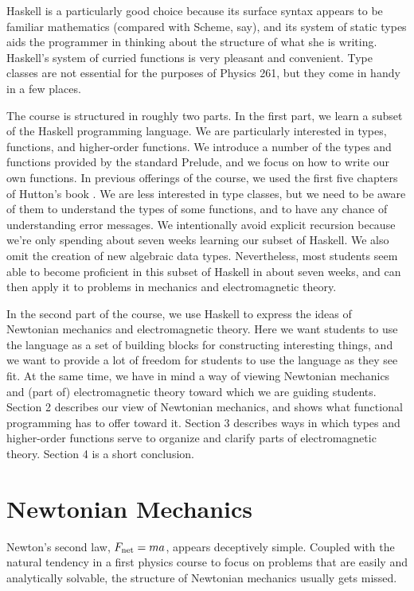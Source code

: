 \documentclass{eptcs}
\begin{document}
Haskell is a particularly good choice because its surface syntax appears to
be familiar mathematics (compared with Scheme, say), and its system
of static types aids the programmer in thinking about the structure
of what she is writing.  Haskell's system of curried functions is
very pleasant and convenient.
Type classes are not essential for the purposes
of Physics 261, but they come in handy in a few places.

The course is structured in roughly two parts.  In the first part, we learn a subset
of the Haskell programming language.
We are particularly interested in types, functions, and higher-order functions.
We introduce a number of the types and functions provided by the standard Prelude,
and we focus on how to write our own functions.
In previous offerings of the course, we used the first five chapters
of Hutton's book \cite{hutton07}.
We are less interested in type classes, but we need to be aware of them
to understand the types of some functions, and to have any chance of understanding
error messages.  We intentionally avoid explicit recursion because we're
only spending about seven weeks learning our subset of Haskell.
We also omit the creation of new algebraic data types.
Nevertheless, most students seem able to become proficient in this subset
of Haskell in about seven weeks, and can then apply it to problems
in mechanics and electromagnetic theory.

In the second part of the course, we use Haskell
to express the ideas of Newtonian mechanics and electromagnetic theory.
Here we want students to use the language as a set of building blocks
for constructing interesting things, and we want to provide a lot of freedom
for students to use the language as they see fit.
At the same time, we have in mind
a way of viewing Newtonian mechanics and (part of) electromagnetic theory
toward which we are guiding students.
Section 2 describes our view of Newtonian mechanics, and shows
what functional programming has to offer toward it.
Section 3 describes ways in which types and higher-order functions
serve to organize and clarify parts of electromagnetic theory.
Section 4 is a short conclusion.

\section{Newtonian Mechanics}

Newton's second law, $F_{\rm net} = m a$, appears deceptively simple.
Coupled with the natural tendency in a first physics course
to focus on problems that are easily and analytically solvable,
the structure of Newtonian mechanics usually gets missed.
\end{document}
